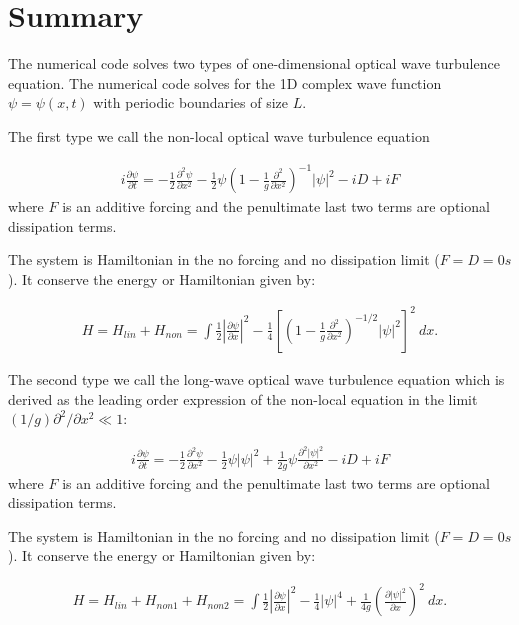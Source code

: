 \documentclass[%
 reprint,
superscriptaddress,
aps,
pra,
onecolumn, 
]{revtex4-1}
\begin{document}
\section{Summary}


The numerical code solves two types of one-dimensional optical wave turbulence equation. The numerical code solves for the 1D complex wave function $\psi = \psi(x,t)$ with periodic boundaries of size $L$.

The first type we call the non-local optical wave turbulence equation

\begin{align*}
i\frac{\partial \psi}{\partial t}=-\frac{1}{2}\frac{\partial^2 \psi}{\partial x^2} -\frac{1}{2}\psi\left( 1- \frac{1}{g}\frac{\partial^2}{\partial x ^2}\right)^{-1}|\psi|^2 -iD + iF
\end{align*}
where $F$ is an additive forcing and the penultimate last two terms are optional dissipation terms.


The system is Hamiltonian in the no forcing and no dissipation limit ($F=D=0s$). It conserve the energy or Hamiltonian given by:

\begin{align*}
H = H_{lin}+H_{non} =   \int \frac{1}{2}\left| \frac{\partial \psi}{\partial x}\right|^2   - \frac{1}{4}\left[ \left( 1- \frac{1}{g}\frac{\partial^2}{\partial x^2}\right)^{-1/2}|\psi|^2\right]^2 \ dx.
\end{align*}

The second type we call the long-wave optical wave turbulence equation which is derived as the leading order expression of the non-local equation in the limit $(1/g)\partial^2/\partial x^2 \ll 1$:

\begin{align*}
i\frac{\partial \psi}{\partial t}=-\frac{1}{2}\frac{\partial^2 \psi}{\partial x^2}  -\frac{1}{2}\psi|\psi|^2 + \frac{1}{2g}\psi\frac{\partial^2|\psi|^2}{\partial x ^2} -iD + iF
\end{align*}
where $F$ is an additive forcing and the penultimate last two terms are optional dissipation terms.


The system is Hamiltonian in the no forcing and no dissipation limit ($F=D=0s$). It conserve the energy or Hamiltonian given by:

\begin{align*}
H = H_{lin}+H_{non1} + H_{non2} =   \int \frac{1}{2}\left| \frac{\partial \psi}{\partial x}\right|^2   - \frac{1}{4}|\psi|^4 + \frac{1}{4g} \left(\frac{\partial |\psi|^2}{\partial x}\right)^{2} \ dx.
\end{align*}
\end{document}

